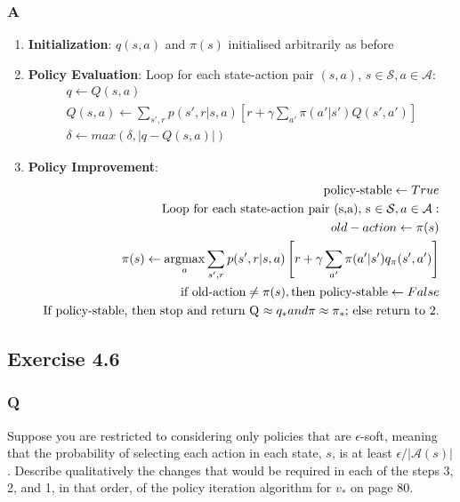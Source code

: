 \subsubsection{A}
\begin{enumerate}
	\item \textbf{Initialization}: $q(s,a)$ and $\pi(s)$ initialised arbitrarily as before
	\item \textbf{Policy Evaluation}: Loop for each state-action pair $(s,a)$, $s \in \mathcal{S}, a \in \mathcal{A}$:\\
	\begin{equation}
	\begin{aligned}
		q \leftarrow Q(s,a) \\
		Q(s,a) \leftarrow \sum_{s',r} p(s', r | s, a) \left[r + \gamma \sum_{a'} \pi(a' | s') Q(s', a')\right] \\
		\delta \leftarrow max(\delta, |q - Q(s,a)|)
	\end{aligned}
	\end{equation}
	\item \textbf{Policy Improvement}: \\
	\begin{equation}
	\begin{aligned}
		\text{policy-stable} \leftarrow True \\
		\text{Loop for each state-action pair (s,a), s $\in \mathcal{S}, a \in \mathcal{A}$}:\\
		old-action \leftarrow \pi(s)\\
		\pi(s) \leftarrow \operatorname*{\arg\!\max}_a \sum_{s',r} p(s', r | s, a) \left[r + \gamma \sum_{a'} \pi(a' | s') q_\pi(s', a')\right] \\
		\text{if old-action} \neq \pi(s), \text{then policy-stable} \leftarrow False \\
		\text{If policy-stable, then stop and return Q $\approx q_* and \pi \approx \pi_*$; else return to 2.} \\
	\end{aligned}
	\end{equation}
\end{enumerate}

\subsection{Exercise 4.6}
\subsubsection{Q}
Suppose you are restricted to considering only policies that are $\epsilon$-soft, meaning that the probability of selecting each action in each state, $s$, is at least $\epsilon /|\mathcal{A}(s)|$. Describe qualitatively the changes that would be required in each of the steps 3, 2, and 1, in that order, of the policy iteration algorithm for $v_*$ on page 80.
